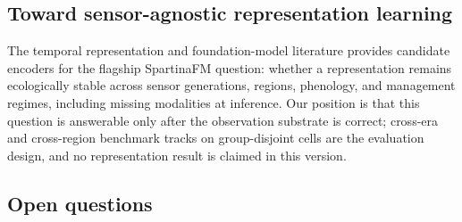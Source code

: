 \subsection{Toward sensor-agnostic representation learning}
The temporal representation and foundation-model literature
\citep{russwurm2020selfattn,garnot2020pixelset,cong2022satmae,fuller2023croma,jakubik2024prithvi,xiong2024dofa}
provides candidate encoders for the flagship SpartinaFM question:
whether a representation remains ecologically stable across sensor
generations, regions, phenology, and management regimes, including
missing modalities at inference. Our position is that this question is
answerable only after the observation substrate is correct; cross-era
and cross-region benchmark tracks on group-disjoint cells
\citep{tuia2016da,ploton2020spatial} are the evaluation design, and no
representation result is claimed in this version.

\subsection{Open questions}
